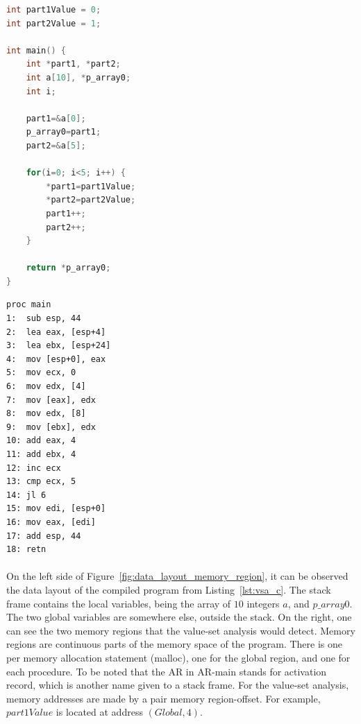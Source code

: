 \noindent\begin{minipage}{.45\textwidth}
	\begin{lstlisting}[caption={Sample of C code used for the value-set analysis. This has been taken from the paper of Gogul Balakrishnan et al~\cite{balakrishnan2004analyzing}.}, label={lst:vsa_c}, frame=tlrb, language=C]
int part1Value = 0;
int part2Value = 1;

int main() {
	int *part1, *part2;
	int a[10], *p_array0;
	int i;
	
	part1=&a[0];
	p_array0=part1;
	part2=&a[5];
	
	for(i=0; i<5; i++) {
		*part1=part1Value;
		*part2=part2Value;
		part1++;
		part2++;
	}
	
	return *p_array0;
}
	\end{lstlisting}
\end{minipage}\hfill
\begin{minipage}{.45\textwidth}
	\begin{lstlisting}[caption={Assembly code resulting from the C code found in Listing~\ref{lst:vsa_c}. This has been taken from the paper of Gogul Balakrishnan et al~\cite{balakrishnan2004analyzing}.}, label={lst:vsa_asm}, frame=tlrb, language={[x86masm]Assembler}]
    proc main
1:  sub esp, 44
2:  lea eax, [esp+4]
3:  lea ebx, [esp+24]
4:  mov [esp+0], eax
5:  mov ecx, 0
6:  mov edx, [4]
7:  mov [eax], edx
8:  mov edx, [8]
9:  mov [ebx], edx
10: add eax, 4
11: add ebx, 4
12: inc ecx
13: cmp ecx, 5
14: jl 6
15: mov edi, [esp+0]
16: mov eax, [edi]
17: add esp, 44
18: retn
	\end{lstlisting}
\end{minipage}

\paragraph{}
On the left side of Figure~\ref{fig:data_layout_memory_region}, it can be observed the data layout of the compiled program from Listing~\ref{lst:vsa_c}. The stack frame contains the local variables, being the array of $10$ integers $a$, and $p\_array0$. The two global variables are somewhere else, outside the stack. On the right, one can see the two memory regions that the value-set analysis would detect. Memory regions are continuous parts of the memory space of the program. There is one per memory allocation statement (malloc), one for the global region, and one for each procedure. To be noted that the AR in AR-main stands for activation record, which is another name given to a stack frame. For the value-set analysis, memory addresses are made by a pair memory region-offset. For example, $part1Value$ is located at address $(Global, 4)$.

